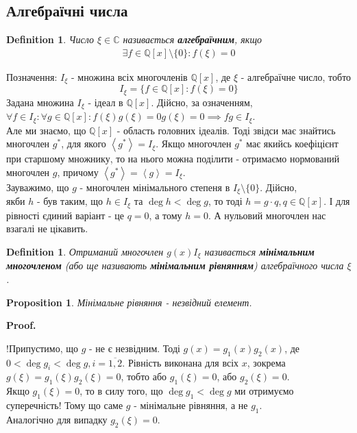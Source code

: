 \documentclass[a4paper, 14pt]{extarticle}
\makeatletter
\theoremstyle{theoremdd}
\theoremstyle{theoremdd}
\newtheorem{definition}[theorem]{Definition}
\theoremstyle{theoremdd}
\theoremstyle{theoremdd}
\theoremstyle{theoremdd}
\newtheorem{proposition}[theorem]{Proposition}
\theoremstyle{theoremdd}
\theoremstyle{theoremdd}
\theoremstyle{theoremdd}
\def\qed{$\blacksquare$}
\renewenvironment{proof}[1][Proof.\\]{\par
\pushQED{\hfill \qed}%
\normalfont \topsep6\p@\@plus6\p@\relax
\trivlist
\item\relax
{\bfseries
#1\@addpunct{.}}\hspace\labelsep\ignorespaces
}{%
\popQED\endtrivlist\@endpefalse
}
\makeatother
\begin{document}
\subsection{Алгебраїчні числа}
\begin{definition}
Число $\xi \in \mathbb{C}$ називається \textbf{алгебраїчним}, якщо
\begin{align*}
\exists f \in \mathbb{Q}[x] \setminus \{0\}: f(\xi) = 0
\end{align*}
\end{definition}
Позначення: $I_\xi$ - множина всіх многочленів $\mathbb{Q}[x]$, де $\xi$ - алгебраїчне число, тобто
$$I_\xi = \{f \in \mathbb{Q}[x]: f(\xi) = 0\}$$
Задана множина $I_{\xi}$ - ідеал в $\mathbb{Q}[x]$. Дійсно, за означенням,\\
$\forall f \in I_{\xi}: \forall g \in \mathbb{Q}[x]: f(\xi)g(\xi) = 0 g(\xi) = 0 \implies fg \in I_{\xi}$.
\bigskip \\
Але ми знаємо, що $\mathbb{Q}[x]$ - область головних ідеалів. Тоді звідси має знайтись многочлен $g^*$, для якого $\left< g^* \right> = I_\xi$. Якщо многочлен $g^*$ має якийсь коефіцієнт при старшому множнику, то на нього можна поділити - отримаємо нормований многочлен $g$, причому $\left< g^* \right> = \left< g \right> = I_\xi$.
\bigskip \\
Зауважимо, що $g$ - многочлен мінімального степеня в $I_\xi \setminus \{0\}$. Дійсно,\\
якби $h$ - був таким, що $h \in I_\xi$ та $\deg h < \deg g$, то тоді $h = g \cdot q, q \in \mathbb{Q}[x]$. І для рівності єдиний варіант - це $q = 0$, а тому $h = 0$. А нульовий многочлен нас взагалі не цікавить.

\begin{definition}
Отриманий многочлен $g(x) I_\xi$ називається \textbf{мінімальним многочленом} (або ще називають \textbf{мінімальним рівнянням}) алгебраїчного числа $\xi$.
\end{definition}

\begin{proposition}
Мінімальне рівняння - незвідний елемент.
\end{proposition}

\begin{proof}
!Припустимо, що $g$ - не є незвідним. Тоді $g(x) = g_1(x)g_2(x)$, де \\ $0 < \deg g_{i} < \deg g, i = \overline{1,2}$. Рівність виконана для всіх $x$, зокрема\\
$g(\xi) = g_1(\xi) g_2(\xi) = 0$, тобто або $g_1(\xi) = 0$, або $g_2(\xi) = 0$.\\
Якщо $g_1(\xi) = 0$, то в силу того, що $\deg g_1 < \deg g$ ми отримуємо суперечність! Тому що саме $g$ - мінімальне рівняння, а не $g_1$.\\
Аналогічно для випадку $g_2(\xi) = 0$.
\end{proof}
\end{document}

